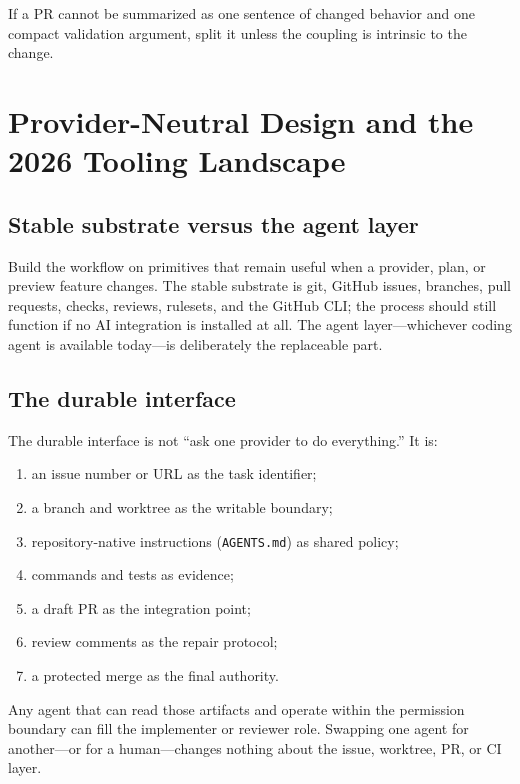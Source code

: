 \documentclass[11pt]{article}
\newcommand{\co}[1]{\lstinline[basicstyle=\ttfamily\color{gwInk}]{#1}}
\begin{document}
\begin{rulebox}
If a PR cannot be summarized as one sentence of changed behavior and one compact validation
argument, split it unless the coupling is intrinsic to the change.
\end{rulebox}

\section{Provider-Neutral Design and the 2026 Tooling Landscape}

\subsection{Stable substrate versus the agent layer}

Build the workflow on primitives that remain useful when a provider, plan, or preview feature
changes. The stable substrate is git, GitHub issues, branches, pull requests, checks, reviews,
rulesets, and the GitHub CLI; the process should still function if no AI integration is installed
at all. The agent layer---whichever coding agent is available today---is deliberately the
replaceable part.

\subsection{The durable interface}

The durable interface is not ``ask one provider to do everything.'' It is:

\begin{enumerate}
  \item an issue number or URL as the task identifier;
  \item a branch and worktree as the writable boundary;
  \item repository-native instructions (\co{AGENTS.md}) as shared policy;
  \item commands and tests as evidence;
  \item a draft PR as the integration point;
  \item review comments as the repair protocol;
  \item a protected merge as the final authority.
\end{enumerate}

Any agent that can read those artifacts and operate within the permission boundary can fill the
implementer or reviewer role. Swapping one agent for another---or for a human---changes nothing
about the issue, worktree, PR, or CI layer.
\end{document}
